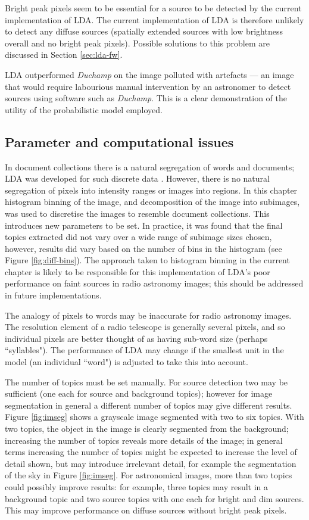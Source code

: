 Bright peak pixels seem to be essential for a source to be detected by the current implementation of LDA. The current implementation of LDA is therefore unlikely to detect any diffuse sources (spatially extended sources with low brightness overall and no bright peak pixels). Possible solutions to this problem are discussed in Section \ref{sec:lda-fw}.

LDA outperformed \emph{Duchamp} on the image polluted with artefacts --- an image that would require labourious manual intervention by an astronomer to detect sources using software such as \emph{Duchamp}. This is a clear demonstration of the utility of the probabilistic model employed.

\subsection{Parameter and computational issues}

In document collections there is a natural segregation of words and documents; LDA was developed for such discrete data \cite{blei2003latent}. However, there is no natural segregation of pixels into intensity ranges or images into regions. In this chapter histogram binning of the image, and decomposition of the image into subimages, was used to discretise the images to resemble document collections. This introduces new parameters to be set. In practice, it was found that the final topics extracted did not vary over a wide range of subimage sizes chosen, however, results did vary based on the number of bins in the histogram (see Figure \ref{fig:diff-bins}). The approach taken to histogram binning in the current chapter is likely to be responsible for this implementation of LDA's poor performance on faint sources in radio astronomy images; this should be addressed in future implementations.

The analogy of pixels to words may be inaccurate for radio astronomy images. The resolution element of a radio telescope is generally several pixels, and so individual pixels are better thought of as having sub-word size (perhaps ``syllables"). The performance of LDA may change if the smallest unit in the model (an individual ``word") is adjusted to take this into account.

The number of topics must be set manually. For source detection two may be sufficient (one each for source and background topics); however for image segmentation in general a different number of topics may give different results. Figure \ref{fig:imseg} shows a grayscale image segmented with two to six topics. With two topics, the object in the image is clearly segmented from the background; increasing the number of topics reveals more details of the image; in general terms increasing the number of topics might be expected to increase the level of detail shown, but may introduce irrelevant detail, for example the segmentation of the sky in Figure \ref{fig:imseg}. For astronomical images, more than two topics could possibly improve results: for example, three topics may result in a background topic and two source topics with one each for bright and dim sources. This may improve performance on diffuse sources without bright peak pixels.

